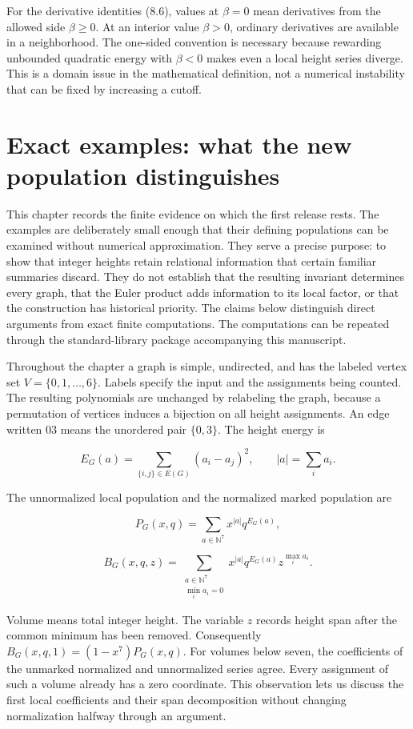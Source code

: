 \documentclass[
  11pt,
  a4paper,
]{report}
\begin{document}
For the derivative identities (8.6), values at \(\beta=0\) mean
derivatives from the allowed side \(\beta\ge0\). At an interior value
\(\beta>0\), ordinary derivatives are available in a neighborhood. The
one-sided convention is necessary because rewarding unbounded quadratic
energy with \(\beta<0\) makes even a local height series diverge. This
is a domain issue in the mathematical definition, not a numerical
instability that can be fixed by increasing a cutoff.

\hypertarget{exact-examples-what-the-new-population-distinguishes}{%
\chapter{Exact examples: what the new population
distinguishes}\label{exact-examples-what-the-new-population-distinguishes}}

This chapter records the finite evidence on which the first release
rests. The examples are deliberately small enough that their defining
populations can be examined without numerical approximation. They serve
a precise purpose: to show that integer heights retain relational
information that certain familiar summaries discard. They do not
establish that the resulting invariant determines every graph, that the
Euler product adds information to its local factor, or that the
construction has historical priority. The claims below distinguish
direct arguments from exact finite computations. The computations can be
repeated through the standard-library package accompanying this
manuscript.

Throughout the chapter a graph is simple, undirected, and has the
labeled vertex set \(V=\{0,1,\ldots,6\}\). Labels specify the input and
the assignments being counted. The resulting polynomials are unchanged
by relabeling the graph, because a permutation of vertices induces a
bijection on all height assignments. An edge written \(03\) means the
unordered pair \(\{0,3\}\). The height energy is

\[
E_G(a)=\sum_{\{i,j\}\in E(G)}(a_i-a_j)^2,
\qquad |a|=\sum_i a_i.
\]

The unnormalized local population and the normalized marked population
are

\[
P_G(x,q)=\sum_{a\in\mathbb N^7}x^{|a|}q^{E_G(a)},
\]

\[
B_G(x,q,z)=\sum_{\substack{a\in\mathbb N^7\\\min_i a_i=0}}
x^{|a|}q^{E_G(a)}z^{\max_i a_i}.
\]

Volume means total integer height. The variable \(z\) records height
span after the common minimum has been removed. Consequently
\(B_G(x,q,1)=(1-x^7)P_G(x,q)\). For volumes below seven, the
coefficients of the unmarked normalized and unnormalized series agree.
Every assignment of such a volume already has a zero coordinate. This
observation lets us discuss the first local coefficients and their span
decomposition without changing normalization halfway through an
argument.
\end{document}
